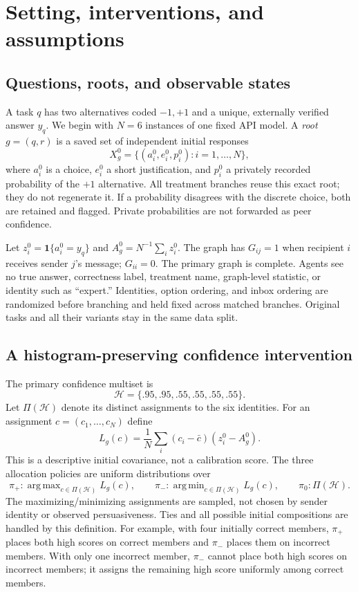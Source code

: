 \documentclass[11pt]{article}
\newcommand{\ind}{\mathbf 1}
\newcommand{\calH}{\mathcal H}
\DeclareMathOperator*{\argmax}{arg\,max}
\DeclareMathOperator*{\argmin}{arg\,min}
\begin{document}
\section{Setting, interventions, and assumptions}
\label{sec:setting}
\subsection{Questions, roots, and observable states}
A task $q$ has two alternatives coded $-1,+1$ and a unique, externally verified answer $y_q$. We begin with $N=6$ instances of one fixed API model. A \emph{root} $g=(q,r)$ is a saved set of independent initial responses
\[
 X_g^0=\{(a_i^0,e_i^0,p_i^0):i=1,\ldots,N\},
\]
where $a_i^0$ is a choice, $e_i^0$ a short justification, and $p_i^0$ a privately recorded probability of the $+1$ alternative. All treatment branches reuse this exact root; they do not regenerate it. If a probability disagrees with the discrete choice, both are retained and flagged. Private probabilities are not forwarded as peer confidence.

Let $z_i^0=\ind\{a_i^0=y_q\}$ and $A_g^0=N^{-1}\sum_i z_i^0$. The graph has $G_{ij}=1$ when recipient $i$ receives sender $j$'s message; $G_{ii}=0$. The primary graph is complete. Agents see no true answer, correctness label, treatment name, graph-level statistic, or identity such as ``expert.'' Identities, option ordering, and inbox ordering are randomized before branching and held fixed across matched branches. Original tasks and all their variants stay in the same data split.

\subsection{A histogram-preserving confidence intervention}
The primary confidence multiset is
\[
 \calH=\{.95,.95,.55,.55,.55,.55\}.
\]
Let $\Pi(\calH)$ denote its distinct assignments to the six identities. For an assignment $c=(c_1,\ldots,c_N)$ define
\begin{equation}
 L_g(c)=\frac1N\sum_i(c_i-\bar c)(z_i^0-A_g^0).
 \label{eq:alignment}
\end{equation}
This is a descriptive initial covariance, not a calibration score. The three allocation policies are uniform distributions over
\begin{equation}
 \pi_+:\argmax_{c\in\Pi(\calH)} L_g(c),\qquad
 \pi_-:\argmin_{c\in\Pi(\calH)} L_g(c),\qquad
 \pi_0:\Pi(\calH).
 \label{eq:policies}
\end{equation}
The maximizing/minimizing assignments are sampled, not chosen by sender identity or observed persuasiveness. Ties and all possible initial compositions are handled by this definition. For example, with four initially correct members, $\pi_+$ places both high scores on correct members and $\pi_-$ places them on incorrect members. With only one incorrect member, $\pi_-$ cannot place both high scores on incorrect members; it assigns the remaining high score uniformly among correct members.
\end{document}
